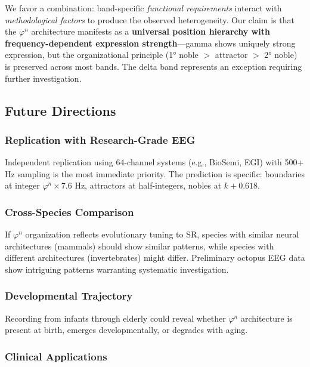 \documentclass[11pt,a4paper]{article}
\newcommand{\phisym}{\varphi}
\begin{document}
We favor a combination: band-specific \textit{functional requirements} interact with \textit{methodological factors} to produce the observed heterogeneity. Our claim is that the $\phisym^n$ architecture manifests as a \textbf{universal position hierarchy with frequency-dependent expression strength}---gamma shows uniquely strong expression, but the organizational principle (1° noble $>$ attractor $>$ 2° noble) is preserved across most bands. The delta band represents an exception requiring further investigation.

\subsection{Future Directions}

\subsubsection{Replication with Research-Grade EEG}

Independent replication using 64-channel systems (e.g., BioSemi, EGI) with 500+ Hz sampling is the most immediate priority. The prediction is specific: boundaries at integer $\phisym^n \times 7.6$ Hz, attractors at half-integers, nobles at $k + 0.618$.

\subsubsection{Cross-Species Comparison}

If $\phisym^n$ organization reflects evolutionary tuning to SR, species with similar neural architectures (mammals) should show similar patterns, while species with different architectures (invertebrates) might differ. Preliminary octopus EEG data show intriguing patterns warranting systematic investigation.

\subsubsection{Developmental Trajectory}

Recording from infants through elderly could reveal whether $\phisym^n$ architecture is present at birth, emerges developmentally, or degrades with aging.

\subsubsection{Clinical Applications}
\end{document}
